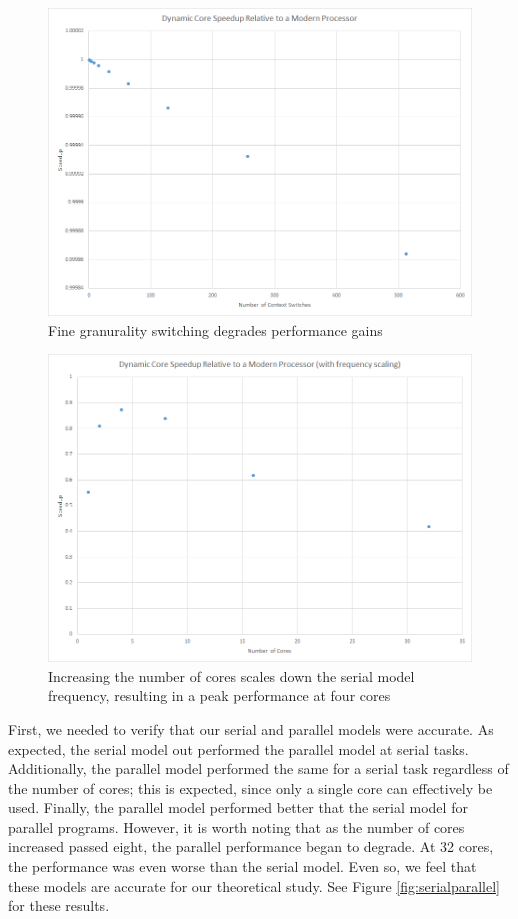 \begin{figure}
    \centering
    \includegraphics[scale=0.8]{../images/Switching.png}
    \caption{Fine granurality switching degrades performance gains}
    \label{fig:switch}
\end{figure}
\begin{figure}
    \centering
    \includegraphics[scale=0.8]{../images/FrequencyScaling.png}
    \caption{Increasing the number of cores scales down the serial model frequency, resulting in a peak performance at four cores}
    \label{fig:frequency}
\end{figure}
First, we needed to verify that our serial and parallel models were accurate. As expected, the serial model out performed the parallel model at serial tasks. Additionally, the parallel model performed the same for a serial task regardless of the number of cores; this is expected, since only a single core can effectively be used. Finally, the parallel model performed better that the serial model for parallel programs. However, it is worth noting that as the number of cores increased passed eight, the parallel performance began to degrade. At 32 cores, the performance was even worse than the serial model. Even so, we feel that these models are accurate for our theoretical study. See Figure \ref{fig:serialparallel} for these results.

